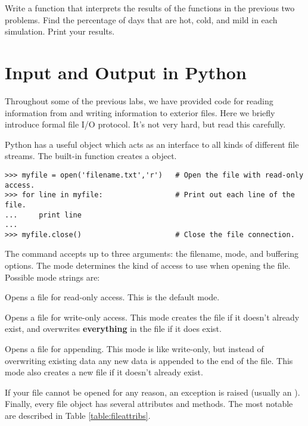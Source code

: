 \begin{problem}
Write a function that interprets the results of the functions in the previous two problems.
Find the percentage of days that are hot, cold, and mild in each simulation.
Print your results.
\end{problem}

\section*{Input and Output in Python}

Throughout some of the previous labs, we have provided code for reading information from and writing information to exterior files.
Here we briefly introduce formal file I/O protocol.
It's not very hard, but read this carefully.

Python has a useful  object which acts as an interface to all kinds of different file streams.
The built-in function  creates a  object.

\begin{lstlisting}
>>> myfile = open('filename.txt','r') 	# Open the file with read-only access.
>>> for line in myfile:                 # Print out each line of the file.
... 	print line
...
>>> myfile.close() 						# Close the file connection.
\end{lstlisting}

The  command accepts up to three arguments: the filename, mode, and buffering options.
The mode determines the kind of access to use when opening the file.
Possible mode strings are:
\begin{description}
\item {} Opens a file for read-only access.
This is the default mode.
\item {} Opens a file for write-only access.
This mode creates the file if it doesn't already exist, and overwrites \textbf{everything} in the file if it does exist.
\item {} Opens a file for appending.
This mode is like write-only, but instead of overwriting existing data any new data is appended to the end of the file.
This mode also creates a new file if it doesn't already exist.
\end{description}

If your file cannot be opened for any reason, an exception is raised (usually an ).
Finally, every file object has several attributes and methods.
The most notable are described in Table \ref{table:fileattribs}.

